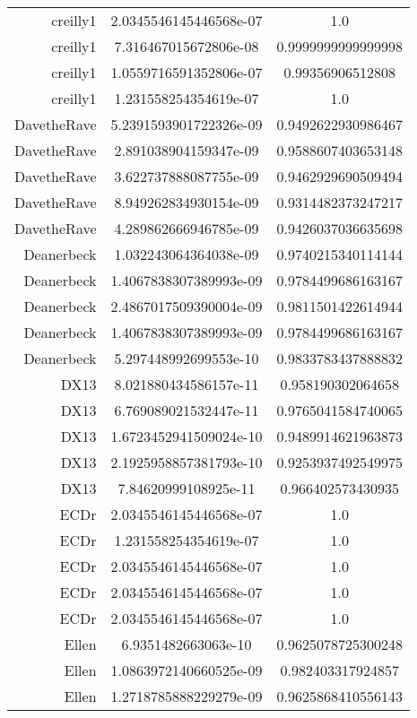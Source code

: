 \begin{tabular}{@{}r c c@{}}
    creilly1 & 2.0345546145446568e-07 & 1.0 \\
    creilly1 & 7.316467015672806e-08 & 0.9999999999999998 \\
    creilly1 & 1.0559716591352806e-07 & 0.99356906512808 \\
    creilly1 & 1.231558254354619e-07 & 1.0 \\
    DavetheRave & 5.2391593901722326e-09 & 0.9492622930986467 \\
    DavetheRave & 2.891038904159347e-09 & 0.9588607403653148 \\
    DavetheRave & 3.622737888087755e-09 & 0.9462929690509494 \\
    DavetheRave & 8.949262834930154e-09 & 0.9314482373247217 \\
    DavetheRave & 4.289862666946785e-09 & 0.9426037036635698 \\
    Deanerbeck & 1.032243064364038e-09 & 0.9740215340114144 \\
    Deanerbeck & 1.4067838307389993e-09 & 0.9784499686163167 \\
    Deanerbeck & 2.4867017509390004e-09 & 0.9811501422614944 \\
    Deanerbeck & 1.4067838307389993e-09 & 0.9784499686163167 \\
    Deanerbeck & 5.297448992699553e-10 & 0.9833783437888832 \\
    DX13 & 8.021880434586157e-11 & 0.958190302064658 \\
    DX13 & 6.769089021532447e-11 & 0.9765041584740065 \\
    DX13 & 1.6723452941509024e-10 & 0.9489914621963873 \\
    DX13 & 2.1925958857381793e-10 & 0.9253937492549975 \\
    DX13 & 7.84620999108925e-11 & 0.966402573430935 \\
    ECDr & 2.0345546145446568e-07 & 1.0 \\
    ECDr & 1.231558254354619e-07 & 1.0 \\
    ECDr & 2.0345546145446568e-07 & 1.0 \\
    ECDr & 2.0345546145446568e-07 & 1.0 \\
    ECDr & 2.0345546145446568e-07 & 1.0 \\
    Ellen & 6.9351482663063e-10 & 0.9625078725300248 \\
    Ellen & 1.0863972140660525e-09 & 0.982403317924857 \\
    Ellen & 1.2718785888229279e-09 & 0.9625868410556143 \\

\end{tabular}
